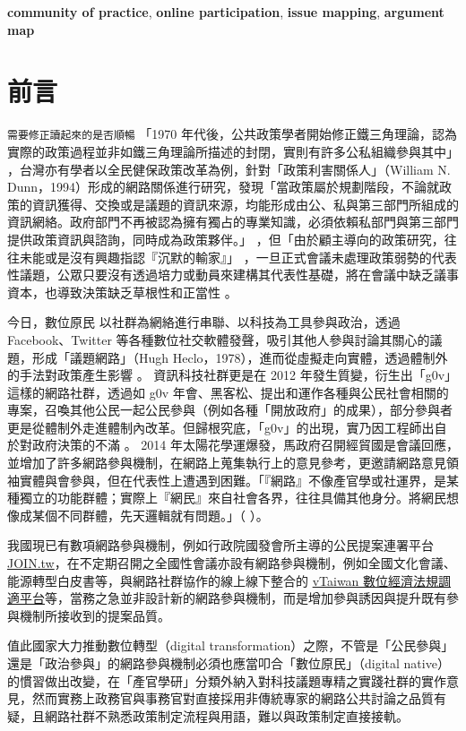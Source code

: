 \documentclass[12pt,a4paper]{article}
\begin{document}
\textbf{community of practice}, \textbf{online participation}, \textbf{issue mapping}, \textbf{argument map}
\section{前言}
\label{sec:org5a6d993}
\texttt{需要修正讀起來的是否順暢}
「1970 年代後，公共政策學者開始修正鐵三角理論，認為實際的政策過程並非如鐵三角理論所描述的封閉，實則有許多公私組織參與其中」 \citep*{luo15_gong} ，台灣亦有學者以全民健保政策改革為例，針對「政策利害關係人」（William N. Dunn，1994）形成的網路關係進行研究，發現「當政策屬於規劃階段，不論就政策的資訊獲得、交換或是議題的資訊來源，均能形成由公、私與第三部門所組成的資訊網絡。政府部門不再被認為擁有獨占的專業知識，必須依賴私部門與第三部門提供政策資訊與諮詢，同時成為政策夥伴。」\citep{luo2005} ，但「由於顧主導向的政策研究，往往未能或是沒有興趣指認『沉默的輸家』」\citep*{chen11} ，一旦正式會議未處理政策弱勢的代表性議題，公眾只要沒有透過培力或動員來建構其代表性基礎，將在會議中缺乏議事資本，也導致決策缺乏草根性和正當性 \citep*{lo17}。

今日，數位原民 \citep*{prensky2001digital} 以社群為網絡進行串聯、以科技為工具參與政治，透過 Facebook、Twitter 等各種數位社交軟體發聲，吸引其他人參與討論其關心的議題，形成「議題網路」（Hugh Heclo，1978），進而從虛擬走向實體，透過體制外的手法對政策產生影響 \citep*{xue11_xiang} 。 資訊科技社群更是在 2012 年發生質變，衍生出「g0v」這樣的網路社群，透過如 g0v 年會、黑客松、提出和運作各種與公民社會相關的專案，召喚其他公民一起公民參與（例如各種「開放政府」的成果），部分參與者更是從體制外走進體制內改革。但歸根究底，「g0v」的出現，實乃因工程師出自於對政府決策的不滿 \citep*{zheng18} 。 2014 年太陽花學運爆發，馬政府召開經貿國是會議回應，並增加了許多網路參與機制，在網路上蒐集執行上的意見參考，更邀請網路意見領袖實體與會參與，但在代表性上遭遇到困難。「『網路』不像產官學或社運界，是某種獨立的功能群體；實際上『網民』來自社會各界，往往具備其他身分。將網民想像成某個不同群體，先天邏輯就有問題。」（\citep*{albert2014} ）。

我國現已有數項網路參與機制，例如行政院國發會所主導的公民提案連署平台 \href{https://join.gov.tw}{JOIN.tw}，在不定期召開之全國性會議亦設有網路參與機制，例如全國文化會議、能源轉型白皮書等，與網路社群協作的線上線下整合的 \href{https://vtaiwan.tw/}{vTaiwan 數位經濟法規調適平台}等，當務之急並非設計新的網路參與機制，而是增加參與誘因與提升既有參與機制所接收到的提案品質。

值此國家大力推動數位轉型（digital transformation）之際，不管是「公民參與」還是「政治參與」的網路參與機制必須也應當叩合「數位原民」（digital native）的慣習做出改變，在「產官學研」分類外納入對科技議題專精之實踐社群的實作意見，然而實務上政務官與事務官對直接採用非傳統專家的網路公共討論之品質有疑，且網路社群不熟悉政策制定流程與用語，難以與政策制定直接接軌。
\end{document}
